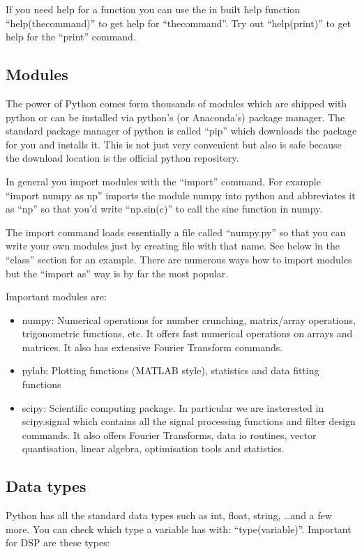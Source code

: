 \documentclass[12pt,a4paper]{article}
\begin{document}
If you need help for a function you can use the in built help function
``help(thecommand)'' to get help for ``thecommand''. Try out ``help(print)''
to get help for the ``print'' command.

\subsection{Modules}
The power of Python comes form thousands of modules which are shipped
with python or can be installed via python's (or Anaconda's) package
manager. The standard package manager of python is called ``pip''
which downloads the package for you and installs it. This is not just
very convenient but also is safe because the download location is the
official python repository.

In general you import modules with the ``import'' command. For example
``import numpy as np'' imports the module numpy into python and
abbreviates it as ``np'' so that you'd write ``np.sin(c)'' to call the
sine function in numpy.

The import command loads essentially a file
called ``numpy.py'' so that you can write your own modules just by
creating file with that name. See below in the ``class'' section for
an example. There are numerous ways how to import modules but the
``import as'' way is by far the most popular.

Important modules are:
\begin{itemize}
\item numpy: Numerical operations for number crunching, matrix/array
  operations, trigonometric functions, etc. It offers fast numerical
  operations on arrays and matrices. It also has extensive Fourier
  Transform commands.
\item pylab: Plotting functions (MATLAB style), statistics and data fitting functions
\item scipy: Scientific computing package. In particular we are insterested in
  scipy.signal which contains all the signal processing functions and
  filter design commands. It also offers Fourier Transforms, data io routines,
  vector quantisation, linear algebra, optimisation tools and statistics.
\end{itemize}


\subsection{Data types}
Python has all the standard data types such as int, float, string,
\ldots and a few more. You can check which type a variable has with:
``type(variable)''. Important for DSP are these types:
\end{document}
